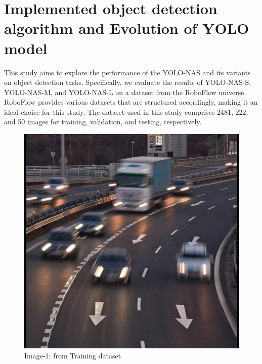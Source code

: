 \section{Implemented object detection algorithm and Evolution of YOLO model}
This study aims to explore the performance of the YOLO-NAS and its variants on object detection tasks. Specifically, we evaluate the results of YOLO-NAS-S, YOLO-NAS-M, and YOLO-NAS-L on a dataset from the RoboFlow universe. RoboFlow provides various datasets that are structured accordingly, making it an ideal choice for this study. The dataset used in this study comprises 2481, 222, and 50 images for training, validation, and testing, respectively.

\begin{figure}[H]
  \begin{minipage}{0.48\textwidth}
    \centering
    \includegraphics[width=\linewidth]{tex/img/train-1.jpg}
    \caption{Image-1: from Training dataset}
    \label{fig:tain-1}
  \end{minipage}%
  \begin{minipage}{0.5\textwidth}
    \centering

\end{minipage}
\end{figure}
